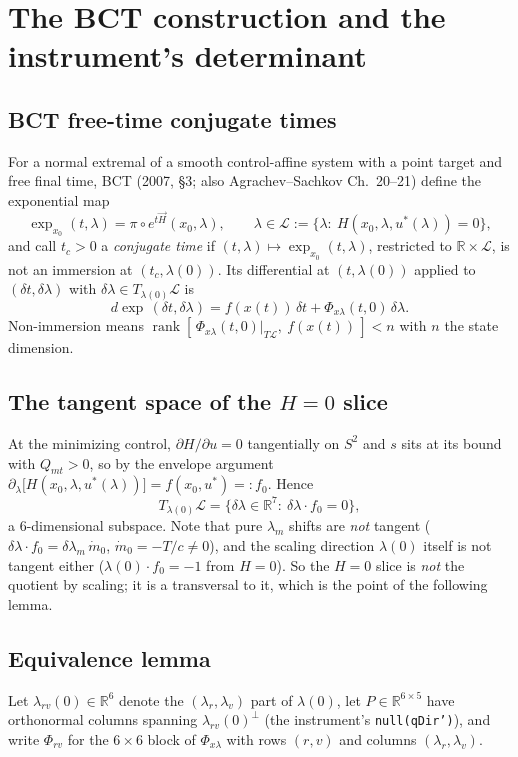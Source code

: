 \documentclass[11pt]{article}
\theoremstyle{definition}
\newcommand{\R}{\mathbb{R}}
\newcommand{\lv}{\lambda_v}
\newcommand{\lr}{\lambda_r}
\newcommand{\lm}{\lambda_m}
\newcommand{\lrv}{\lambda_{rv}}
\newcommand{\Phixl}{\Phi_{x\lambda}}
\begin{document}
\section{The BCT construction and the instrument's determinant}\label{sec:equiv}

\subsection{BCT free-time conjugate times}
For a normal extremal of a smooth control-affine system with a point target and
free final time, BCT (2007, \S3; also Agrachev--Sachkov Ch.~20--21) define the
exponential map
\[
\exp_{x_0}(t,\lambda)=\pi\circ e^{t\vec H}(x_0,\lambda),\qquad
\lambda\in\mathcal L:=\{\lambda:\ H(x_0,\lambda,u^*(\lambda))=0\},
\]
and call $t_c>0$ a \emph{conjugate time} if $(t,\lambda)\mapsto\exp_{x_0}(t,\lambda)$,
restricted to $\R\times\mathcal L$, is not an immersion at $(t_c,\lambda(0))$.
Its differential at $(t,\lambda(0))$ applied to $(\delta t,\delta\lambda)$ with
$\delta\lambda\in T_{\lambda(0)}\mathcal L$ is
\begin{equation}\label{eq:dexp}
d\exp\,(\delta t,\delta\lambda)=f(x(t))\,\delta t+\Phixl(t,0)\,\delta\lambda .
\end{equation}
Non-immersion means $\operatorname{rank}[\,\Phixl(t,0)|_{T\mathcal L},\ f(x(t))\,]<n$
with $n$ the state dimension.

\subsection{The tangent space of the $H=0$ slice}
At the minimizing control, $\partial H/\partial u=0$ tangentially on $S^2$ and
$s$ sits at its bound with $Q_{mt}>0$, so by the envelope argument
$\partial_\lambda\big[H(x_0,\lambda,u^*(\lambda))\big]=f(x_0,u^*)=:f_0$. Hence
\begin{equation}\label{eq:TL}
T_{\lambda(0)}\mathcal L=\{\delta\lambda\in\R^7:\ \delta\lambda\cdot f_0=0\},
\end{equation}
a 6-dimensional subspace. Note that pure $\lm$ shifts are \emph{not} tangent
($\delta\lambda\cdot f_0=\delta\lm\,\dot m_0$, $\dot m_0=-T/c\neq0$), and the
scaling direction $\lambda(0)$ itself is not tangent either
($\lambda(0)\cdot f_0=-1$ from $H=0$). So the $H=0$ slice is \emph{not} the
quotient by scaling; it is a transversal to it, which is the point of the
following lemma.

\subsection{Equivalence lemma}
Let $\lrv(0)\in\R^6$ denote the $(\lr,\lv)$ part of $\lambda(0)$, let $P\in\R^{6\times5}$
have orthonormal columns spanning $\lrv(0)^\perp$ (the instrument's
\texttt{null(qDir')}), and write $\Phi_{rv}$ for the $6\times6$ block of $\Phixl$
with rows $(r,v)$ and columns $(\lr,\lv)$.
\end{document}

